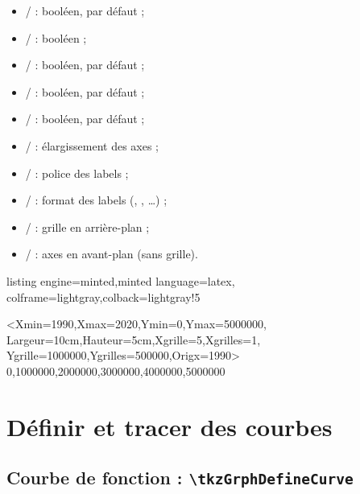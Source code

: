 \documentclass[11pt,a4paper]{ltxdoc}
\begin{document}
\begin{itemize}
	\item {} /  : booléen,  par défaut ;
	\item {} /  : booléen ;
	\item {} /  : booléen,  par défaut ;
	\item {} /  : booléen,  par défaut ;
	\item {} /  : booléen,  par défaut ;
	\item {} /  : élargissement des axes ;
	\item {} /  : police des labels ;
	\item {} /  : format des labels (, , \ldots) ;
	\item {} /  : grille en arrière-plan ;
	\item {} /  : axes en avant-plan (sans grille).
\end{itemize}

\begin{tcblisting}{listing engine=minted,minted language=latex,
  colframe=lightgray,colback=lightgray!5}
\begin{tkzGrph}%
    <Xmin=1990,Xmax=2020,Ymin=0,Ymax=5000000,
    Largeur=10cm,Hauteur=5cm,Xgrille=5,Xgrilles=1,
    Ygrille=1000000,Ygrilles=500000,Origx=1990>
    {0,1000000,2000000,3000000,4000000,5000000}
\end{tkzGrph}
\end{tcblisting}

\pagebreak

\section{Définir et tracer des courbes}

\subsection{Courbe de fonction : \texttt{\textbackslash tkzGrphDefineCurve}}
\end{document}
